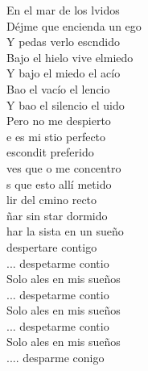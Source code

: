 \begin{cancion}[Despertar][Estopa]
	    En el mar de los lvidos\\
	Déjme que encienda un ego\\
	Y pedas verlo escndido\\
	 Bajo el hielo vive elmiedo\\
	  Y bajo el miedo el acío\\
	Bao el vacío el lencio\\
	Y bao el silencio el uido\\
	    Pero no me despierto\\
	\jump
	e es mi stio perfecto\\
	 escondit preferido\\
	 ves que o me concentro\\
	s que esto allí metido\\
	lir del cmino recto\\
	ñar sin star dormido\\
	har la sista en un sueño\\
	 despertare contigo\\
	\jump
	... despetarme contio\\
	Solo ales en mis sueños\\
	... despetarme contio\\
	Solo ales en mis sueños\\
	... despetarme contio\\
	Solo ales en mis sueños\\
	.... desparme conigo\\
	\jump
\end{cancion}%
